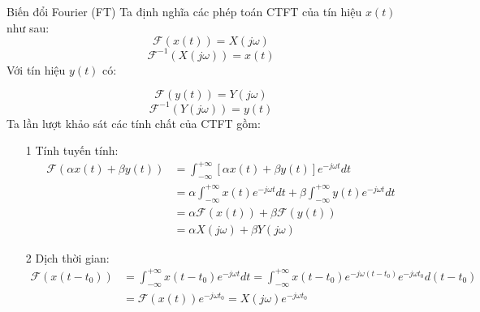 \documentclass[8pt]{beamer}
\begin{document}
\begin{frame}{Biến đổi Fourier (FT)}
Ta định nghĩa các phép toán CTFT của tín hiệu $x(t)$ như sau:
$$\mathscr{F}(x(t))=X(j\omega)$$
$$\mathscr{F}^{-1}(X(j\omega))=x(t)$$
Với tín hiệu $y(t)$ có:

$$\mathscr{F}(y(t))=Y(j\omega)$$
$$\mathscr{F}^{-1}(Y(j\omega))=y(t)$$
Ta lần lượt khảo sát các tính chất của CTFT gồm:
\begin{enumerate}
	\item[1] Tính tuyến tính:
\begin{equation*}
\begin{split}
	\mathscr{F}(\alpha x(t)+\beta y(t))&=\int_{-\infty}^{+\infty}[\alpha x(t)+\beta y(t)]e^{-j\omega t}dt\\
					   &=\alpha \int_{-\infty}^{+\infty}x(t)e^{-j\omega t}dt+\beta\int_{-\infty}^{+\infty}y(t)e^{-j\omega t}dt\\
					   &= \alpha\mathscr{F}(x(t))+\beta\mathscr{F}(y(t))\\
					   &= \alpha X(j\omega)+\beta Y(j\omega)
\end{split}
\end{equation*}
	\item[2] Dịch thời gian:
\begin{equation*}
\begin{split}
	\mathscr{F}(x(t-t_{0}))&=\int_{-\infty}^{+\infty}x(t-t_{0})e^{-j\omega t}dt=\int_{-\infty}^{+\infty}x(t-t_{0})e^{-j\omega (t-t_{0})}e^{-j\omega t_{0}}d(t-t_{0})\\
			       &=\mathscr{F}(x(t))e^{-j\omega t_{0}}=X(j\omega)e^{-j\omega t_{0}}
\end{split}
\end{equation*}
\end{enumerate}
\end{frame}
\end{document}
